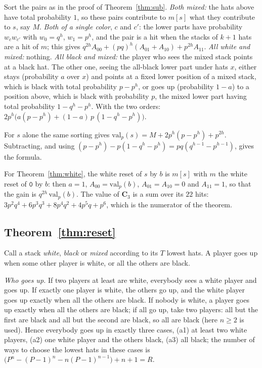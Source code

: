 \documentclass[11pt,a4paper]{article}
\theoremstyle{definition}
\theoremstyle{remark}
\newcommand{\str}[1]{\mathtt{#1}}
\newcommand{\C}{\mathbf{C}}
\begin{document}
Sort the pairs as in the proof of Theorem~\ref{thm:sub}. \emph{Both
mixed:} the hats above have total probability $1$, so these pairs
contribute to $m[s]$ what they contribute to $s$, say $M$. \emph{Both of
a single color}, $c$ and $c'$: the lower parts have probability
$w_c w_{c'}$ with $w_0 = q^h$, $w_1 = p^h$, and the pair is a hit when
the stacks of $k+1$ hats are a hit of $m$; this gives
$q^{2h}A_{00} + (pq)^h(A_{01}+A_{10}) + p^{2h}A_{11}$. \emph{All white
and mixed:} nothing. \emph{All black and mixed:} the player who sees the
mixed stack points at a black hat. The other one, seeing the all-black
lower part under hats $x$, either stays (probability $a$ over $x$) and
points at a fixed lower position of a mixed stack, which is black with
total probability $p - p^h$, or goes up (probability $1-a$) to a
position above, which is black with probability $p$, the mixed lower
part having total probability $1-q^h-p^h$. With the two orders:
$2p^h\bigl(a(p-p^h) + (1-a)\,p\,(1-q^h-p^h)\bigr)$.

For $s$ alone the same sorting gives
$\mathrm{val}_p(s) = M + 2p^h(p - p^h) + p^{2h}$. Subtracting, and
using $(p-p^h) - p(1-q^h-p^h) = pq(q^{h-1}-p^{h-1})$, gives the formula.

For Theorem~\ref{thm:white}, the white reset of $s$ by $b$ is $m[s]$ with
$m$ the white reset of $\str{0}$ by $b$: then $a = 1$,
$A_{00} = \mathrm{val}_p(b)$, $A_{01} = A_{10} = 0$ and $A_{11} = 1$, so
that the gain is $q^{2h}\,\mathrm{val}_p(b)$. The value of
$\C_3$ is a sum over its $22$ hits:
$3p^2q^4+6p^3q^3+8p^4q^2+4p^5q+p^6$, which is the numerator of the
theorem.

\subsection{Theorem~\ref{thm:reset}}\label{app:reset}

Call a stack \emph{white}, \emph{black} or \emph{mixed} according to its
$T$ lowest hats. A player goes up when some other player is white, or
all the others are black.

\emph{Who goes up.} If two players at least are white, everybody sees a
white player and goes up. If exactly one player is white, the others go
up, and the white player goes up exactly when all the others are black.
If nobody is white, a player goes up exactly when all the others are
black; if all go up, take two players: all but the first are black and
all but the second are black, so all are black (here $n \ge 2$ is
used). Hence everybody goes up in exactly three cases, (a1) at least two
white players, (a2) one white player and the others black, (a3) all
black; the number of ways to choose the lowest hats in these cases is
$\bigl(P^n - (P-1)^n - n(P-1)^{n-1}\bigr) + n + 1 = R$.
\end{document}

